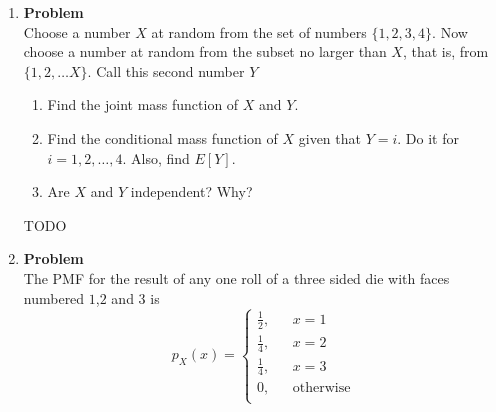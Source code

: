\documentclass[12pt]{article}
\newenvironment{Ex}{\textbf{Problem}\vspace{.75em}\\}{}
\begin{document}
\begin{enumerate}
\begin{Ex}
\begin{equation*}
\begin{aligned}
          \frac{1}{18}, && p_{X,Y,Z}(1,1,0) = \frac{1}{9}, &&
          p_{X,Y,Z}(1,1,1) = \frac{1}{9} \\
        \end{aligned}
      \end{equation*}
      \begin{enumerate}
      \item Find $E[XY\sqrt{Z}]$.
      \item Argue that $E[XY +XZ2 +YZ] = E[XY]+E[XZ2]+E[YZ]$ and then
        compute its value.
      \item Are $X$, $Y$ independent given $Z=1$? Compute $E[XY|Z = 1]$.
      \end{enumerate}
      \begin{solution} \hfill
        {\huge TODO}
      \end{solution}
    \end{Ex}
  \item
    \begin{Ex}
      Choose a number $X$ at random from the set of numbers $\{1, 2,
      3, 4\}$. Now choose a number at random from the subset no larger
      than $X$, that is, from $\{1,2,\ldots X\}$. Call this second
      number $Y$
      \begin{enumerate}
      \item Find the joint mass function of $X$ and $Y$.
      \item Find the conditional mass function of $X$ given that $Y =
        i$. Do it for $i = 1,2,\ldots ,4$. Also, find $E[Y]$.
      \item Are $X$ and $Y$ independent? Why?
      \end{enumerate}
      \begin{solution} \hfill
        {\huge TODO}
      \end{solution}
    \end{Ex}
  \item 
    \begin{Ex}
      The PMF for the result of any one roll of a three sided die with
      faces numbered $1$,$2$ and $3$ is
      \begin{equation*}
        p_X(x) = \left\{
          \begin{aligned}
            \frac{1}{2}, && x=1 \\
            \frac{1}{4}, && x=2 \\
            \frac{1}{4}, && x=3 \\
            0, && \text{otherwise} \\

\end{aligned}
\end{equation*}
\end{Ex}
\end{enumerate}
\end{document}
